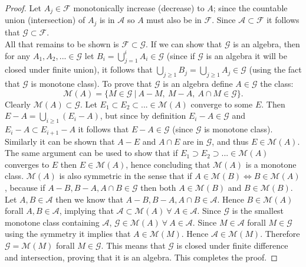  \begin{proof}
   Let $A_j \in \mathscr{F}$ monotonically increase (decrease) to $A$; since the countable union (intersection) of $A_j$ is in $ \mathscr{A}$ so $A$ must also be in $ \mathscr{F}$. Since $ \mathscr{A}\subset \mathscr{F}$ it follows that $ \mathscr{G}\subset \mathscr{F}$.\\

   All that remains to be shown is $ \mathscr{F} \subset \mathscr{G}$. If we can show that $ \mathscr{G}$ is an algebra, then for any $A_1, A_2,...\in \mathscr{G}$ let $B_i = \bigcup_{j=1}^i A_i \in \mathscr{G}$ (since if $ \mathscr{G}$ is an algebra it will be closed under finite union), it follows that $\bigcup_{j\geq 1} B_j = \bigcup_{j\geq 1}A_j \in \mathscr{G}$ (using the fact that $\mathscr{G}$ is monotone class). To prove that $ \mathscr{G}$ is an algebra define $A \in \mathscr{G}$ the class:
   \[ \mathscr{M} (A) =\{ M\in \mathscr{G}\ |\ A-M,\ M-A,\ A\cap M \in \mathscr{G}\}.\]
   Clearly $ \mathscr{M} (A) \subset \mathscr{G}$. Let $E_1\subset E_2 \subset ... \in \mathscr{M} (A)$ converge to some $E$. Then $E-A = \bigcup_{i\geq 1} (E_i - A)$, but since by definition $E_i-A \in \mathscr{G}$ and $E_i-A \subset E_{i+1} -A$ it follows that $E-A\in \mathscr{G}$ (since $ \mathscr{G}$ is monotone class). Similarly it can be shown that $A-E$ and $A\cap E$ are in $ \mathscr{G}$, and thus $E \in \mathscr{M} (A)$. The same argument can be used to show that if $E_1 \supset E_2 \supset... \in \mathscr{M} (A)$ converges to $E$ then $E \in \mathscr{M} (A)$, hence concluding that $ \mathscr{M} (A)$ is a monotone class. $ \mathscr{M} (A)$ is also symmetric in the sense that if $A \in \mathscr{M} (B) \iff B \in \mathscr{M} (A)$, because if $A-B, B-A, A\cap B \in \mathscr{G}$ then both $A \in \mathscr{M} (B)$ and $B \in \mathscr{M} (B)$.\\

   Let $A,B \in \mathscr{A}$ then we know that $A-B, B-A, A\cap B \in \mathscr{A}$. Hence $B \in \mathscr{M} (A)$ forall $A,B \in \mathscr{A}$, implying that $ \mathscr{A} \subset \mathscr{M} (A)\ \forall\ A \in \mathscr{A}$. Since $ \mathscr{G}$ is the smallest monotone class containing $ \mathscr{A}$, $ \mathscr{G} \in \mathscr{M} (A)\ \forall\ A\in \mathscr{A}$. Since $M \in \mathscr{A}$ forall $M \in \mathscr{G}$ using the symmetry it implies that $ A \in \mathscr{M} (M)$. Hence $ \mathscr{A} \in \mathscr{M}(M)$. Therefore $ \mathscr{G} = \mathscr{M} (M)$ forall $M \in \mathscr{G}$. This means that $ \mathscr{G}$ is closed under finite difference and intersection, proving that it is an algebra. This completes the proof.     
 \end{proof}
